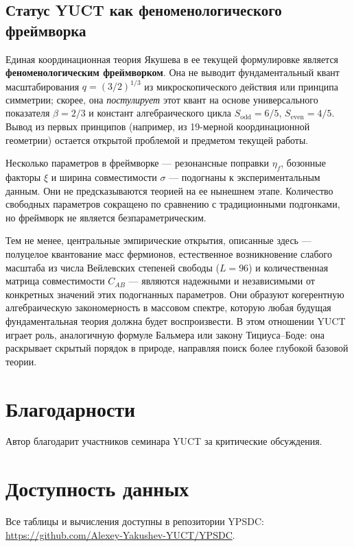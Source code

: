 \documentclass[11pt,a4paper]{article}
\begin{document}
	\subsection*{Статус YUCT как феноменологического фреймворка}
	
	Единая координационная теория Якушева в ее текущей формулировке является \textbf{феноменологическим фреймворком}. Она не выводит фундаментальный квант масштабирования \(q = (3/2)^{1/3}\) из микроскопического действия или принципа симметрии; скорее, она \emph{постулирует} этот квант на основе универсального показателя \(\beta = 2/3\) и констант алгебраического цикла \(S_{\mathrm{odd}}=6/5\), \(S_{\mathrm{even}}=4/5\). Вывод из первых принципов (например, из 19-мерной координационной геометрии) остается открытой проблемой и предметом текущей работы.
	
	Несколько параметров в фреймворке — резонансные поправки \(\eta_f\), бозонные факторы \(\xi\) и ширина совместимости \(\sigma\) — подогнаны к экспериментальным данным. Они не предсказываются теорией на ее нынешнем этапе. Количество свободных параметров сокращено по сравнению с традиционными подгонками, но фреймворк не является безпараметрическим.
	
	Тем не менее, центральные эмпирические открытия, описанные здесь — полуцелое квантование масс фермионов, естественное возникновение слабого масштаба из числа Вейлевских степеней свободы (\(L=96\)) и количественная матрица совместимости \(C_{AB}\) — являются надежными и независимыми от конкретных значений этих подогнанных параметров. Они образуют когерентную алгебраическую закономерность в массовом спектре, которую любая будущая фундаментальная теория должна будет воспроизвести. В этом отношении YUCT играет роль, аналогичную формуле Бальмера или закону Тициуса–Боде: она раскрывает скрытый порядок в природе, направляя поиск более глубокой базовой теории.
	
	\section*{Благодарности}
	Автор благодарит участников семинара YUCT за критические обсуждения.
	
	\section*{Доступность данных}
	Все таблицы и вычисления доступны в репозитории YPSDC: \url{https://github.com/Alexey-Yakushev-YUCT/YPSDC}.
	
\end{document}
